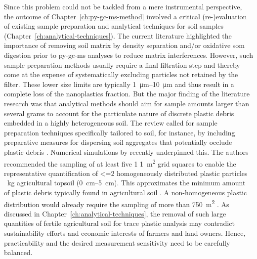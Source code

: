 Since this problem could not be tackled from a mere instrumental perspective, the outcome of Chapter~\ref{ch:py-gc-ms-method} involved a critical (re-)evaluation of existing sample preparation and analytical techniques for soil samples (Chapter~\ref{ch:analytical-techniques}). The current literature highlighted the importance of removing soil matrix by density separation and/or oxidative \ac{som} digestion prior to \ac{py-gc-ms} analyses to reduce matrix interferences. However, such sample preparation methods usually require a final filtration step and thereby come at the expense of systematically excluding particles not retained by the filter. These lower size limits are typically \SIrange{1}{10}{\micro\meter} and thus result in a complete loss of the nanoplastics fraction.
But the major finding of the literature research was that analytical methods should aim for sample amounts larger than several grams to account for the particulate nature of discrete plastic debris embedded in a highly heterogeneous soil. The review called for sample preparation techniques specifically tailored to soil, for instance, by including preparative measures for dispersing soil aggregates that potentially occlude plastic debris \citep[Chapter~\ref{ch:intro};][]{ZhangDistribution2018}. Numerical simulations by \citet{YuHow2021} recently underpinned this. The authors recommended the sampling of at least five 1\,\texttimes\,\SI{1}{\square\meter} grid squares to enable the representative quantification of \num{<=2} homogeneously distributed plastic particles \si{\per\kilo\gram} agricultural topsoil (\SIrange{0}{5}{\centi\meter}). This approximates the minimum amount of plastic debris typically found in agricultural soil \citep{BuksGlobal2020}. A non-homogeneous plastic distribution would already require the sampling of more than \SI{750}{\square\meter} \citep{YuHow2021}. As discussed in Chapter~\ref{ch:analytical-techniques}, the removal of such large quantities of fertile agricultural soil for trace plastic analysis may contradict sustainability efforts and economic interests of farmers and land owners. Hence, practicability and the desired measurement sensitivity need to be carefully balanced.


